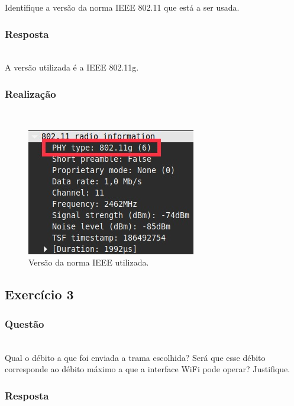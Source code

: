 \documentclass{llncs}
\begin{document}
Identifique a versão da norma IEEE 802.11 que está a ser usada.

\subsubsection{Resposta}\rule[-10pt]{0pt}{10pt}\\

A versão utilizada é a IEEE 802.11g.

\subsubsection{Realização}\rule[-10pt]{0pt}{10pt}\\

\begin{figure}
  \begin{center}
  \includegraphics[scale=0.6]{./imagens/ex2.png} 
  \end{center}
  \caption{Versão da norma IEEE utilizada.}
  \label{fig:norma_ieee}
\end{figure}


\clearpage
\subsection{Exercício 3}
\subsubsection{Questão}\rule[-10pt]{0pt}{10pt}\\

Qual o débito a que foi enviada a trama escolhida? Será que esse débito corresponde ao débito máximo a que a interface WiFi pode operar? Justifique.

\subsubsection{Resposta}\rule[-10pt]{0pt}{10pt}\\
\end{document}
